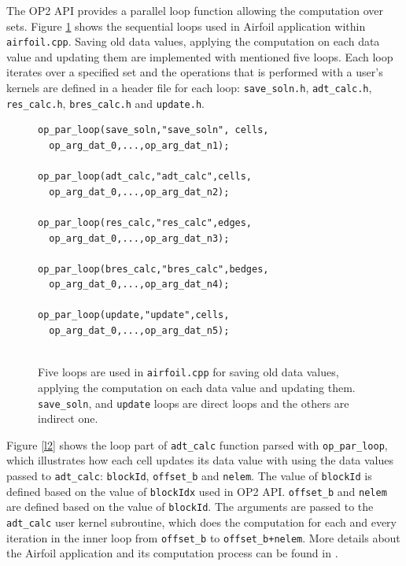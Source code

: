 \documentclass[conference]{IEEEtran}
\begin{document}
The OP2 API provides a parallel loop function allowing the computation over sets. Figure \ref{l1} shows the sequential loops used in Airfoil application within \texttt{airfoil.cpp}. Saving old data values, applying the computation on each data value and updating them are implemented with mentioned five loops. Each loop iterates over a specified set and the operations that is performed with a user's kernels are defined in a header file for each loop: \texttt{save\_soln.h}, \texttt{adt\_calc.h}, \texttt{res\_calc.h}, \texttt{bres\_calc.h} and \texttt{update.h}. 

\begin{figure} [!h]
    \begin{lstlisting}
op_par_loop(save_soln,"save_soln", cells,
  op_arg_dat_0,...,op_arg_dat_n1);
  
op_par_loop(adt_calc,"adt_calc",cells,
  op_arg_dat_0,...,op_arg_dat_n2);
  
op_par_loop(res_calc,"res_calc",edges,
  op_arg_dat_0,...,op_arg_dat_n3);

op_par_loop(bres_calc,"bres_calc",bedges,
  op_arg_dat_0,...,op_arg_dat_n4);
  
op_par_loop(update,"update",cells,
  op_arg_dat_0,...,op_arg_dat_n5);
  
    \end{lstlisting}
    \caption{\small{Five loops are used in \texttt{airfoil.cpp} for saving old data values, applying the computation on each data value and updating them. \texttt{save\_soln},  and \texttt{update} loops are direct loops and the others are indirect one.}}
    \label{l1}
\end{figure}


Figure \ref{l2} shows the loop part of \texttt{adt\_calc} function parsed with \texttt{op\_par\_loop}, which illustrates how each cell updates its data value with using the data values passed to \texttt{adt\_calc}: \texttt{blockId}, \texttt{offset\_b} and \texttt{nelem}. The value of \texttt{blockId} is defined based on the value of \texttt{blockIdx} used in OP2 API.  \texttt{offset\_b} and \texttt{nelem} are defined based on the value of \texttt{blockId}. The arguments are passed to the \texttt{adt\_calc} user kernel subroutine, which does the computation for each and every iteration in the inner loop from \texttt{offset\_b} to \texttt{offset\_b+nelem}. More details about the Airfoil application and its computation process can be found in \cite{o8}.
\end{document}
